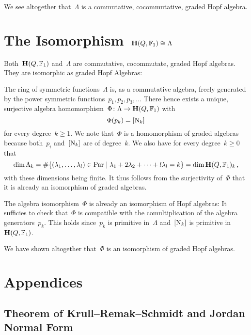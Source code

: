 \documentclass[a4paper,11pt]{scrartcl}
\begin{document}
We see altogether that~$\Lambda$ is a commutative, cocommutative, graded Hopf algebra.





\section{The Isomorphism~$\mathbf{H}(Q, \mathbb{F}_1) \cong \Lambda$}

Both~$\mathbf{H}(Q, \mathbb{F}_1)$ and~$\Lambda$ are commutative, cocommutate, graded Hopf algebras.
They are isomorphic as graded Hopf Algebras:

The ring of symmetric functions~$\Lambda$ is, as a commutative algebra, freely generated by the power symmetric functions~$p_1, p_2, p_3, \dotsc$
There hence exists a unique, surjective algebra homomorphism~$\Phi \colon \Lambda \to \mathbf{H}(Q, \mathbb{F}_1)$ with
\[
  \Phi(p_k) = [\mathrm{N}_k]
\]
for every degree~$k \geq 1$.
We note that~$\Phi$ is a homomorphism of graded algebras because both~$p_i$ and~$[ \mathrm{N}_k ]$ are of degree~$k$.
We also have for every degree~$k \geq 0$ that
\[
  \dim \Lambda_k
  =
  \counting
  \{
    (\lambda_1, \dotsc, \lambda_l) \in \Par
  \suchthat
    \lambda_1 + 2 \lambda_2 + \dotsb + l \lambda_l = k
  \}
  =
  \dim \Hall(Q, \Finite_1)_k \,,
\]
with these dimensions being finite.
It thus follows from the surjectivity of~$\Phi$ that it is already an isomorphism of graded algebras.

The algebra isomorphism~$\Phi$ is already an isomorphism of Hopf algebras:
It sufficies to check that~$\Phi$ is compatible with the comultiplication of the algebra generators~$p_k$.
This holds since~$p_k$ is primitive in~$\Lambda$ and~$[ \mathrm{N}_k ]$ is primitive in~$\mathbf{H}(Q, \mathbb{F}_1)$.

We have shown altogether that~$\Phi$ is an isomorphism of graded Hopf algebras.






\newpage
\appendix
\section{Appendices}



\subsection{Theorem of Krull--Remak--Schmidt and Jordan Normal Form}
\label{jordan normal form}
\end{document}
